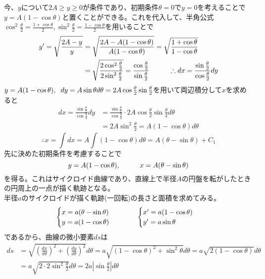 \documentclass{jsarticle}
\begin{document}
今、\(y\)について\(2A\geq y\geq0\)が条件であり、初期条件\(\theta=0でy=0\)を考えることで\(y=A(1-\cos\theta)\)と置くことができる。これを代入して、半角公式\(\cos^{2}\frac{\theta}{2}=\frac{1+\cos\theta}{2},\sin^{2}\frac{\theta}{2}=\frac{1-\cos\theta}{2}\)を用いることで
\begin{align*}
y^{\prime}=\sqrt{\frac{2A-y}{y}}&=\sqrt{\frac{2A-A(1-\cos\theta)}{A(1-\cos\theta)}}=\sqrt{\frac{1+\cos\theta}{1-\cos\theta}}\\
&=\sqrt{\frac{2\cos^{2}\frac{\theta}{2}}{2\sin^{2}\frac{\theta}{2}}}=\frac{\cos\frac{\theta}{2}}{\sin\frac{\theta}{2}}\hspace{10mm}\therefore dx=\frac{\sin\frac{\theta}{2}}{\cos\frac{\theta}{2}}dy
\end{align*}
\(y=A(1-\cos\theta),\hspace{2mm}dy=A\sin\theta d\theta=2A\cos\frac{\theta}{2}\sin\frac{\theta}{2}\)を用いて両辺積分して\(x\)を求めると
\begin{align*}
dx=\frac{\sin\frac{\theta}{2}}{\cos\frac{\theta}{2}}dy&=\frac{\sin\frac{\theta}{2}}{\cos\frac{\theta}{2}}\cdot2A\cos\frac{\theta}{2}\sin\frac{\theta}{2}d\theta\\
&=2A\sin^{2}\frac{\theta}{2}=A(1-\cos\theta)d\theta
\end{align*}
\[\therefore x=\int dx=A\int(1-\cos\theta)d\theta=A(\theta-\sin\theta)+C_{1}\]
先に決めた初期条件を考慮することで
\[y=A(1-\cos\theta),\hspace{10mm}x=A(\theta-\sin\theta)\]
を得る。これはサイクロイド曲線であり、直線上で半径\(A\)の円盤を転がしたときの円周上の一点が描く軌跡となる。\\
半径\(a\)のサイクロイドが描く軌跡(一回転)の長さと面積を求めてみる。\\
\[\begin{cases}
x=a(\theta-\sin\theta)\\
y=a(1-\cos\theta)\end{cases}\hspace{10mm}\begin{cases}
x^{\prime}=a(1-\cos\theta)\\
y^{\prime}=a\sin\theta\end{cases}\]
であるから、曲線の微小要素\(ds\)は
\begin{align*}
ds&=\sqrt{\left(\frac{dx}{d\theta}\right)^{2}+\left(\frac{dy}{d\theta}\right)^{2}}d\theta=a\sqrt{(1-\cos\theta)^{2}+\sin^{2}\theta}d\theta=a\sqrt{2(1-\cos\theta)}d\theta\\
&=a\sqrt{2\cdot2\sin^{2}\frac{\theta}{2}}d\theta=2a\left|\sin\frac{\theta}{2}\right|d\theta
\end{align*}
\end{document}
